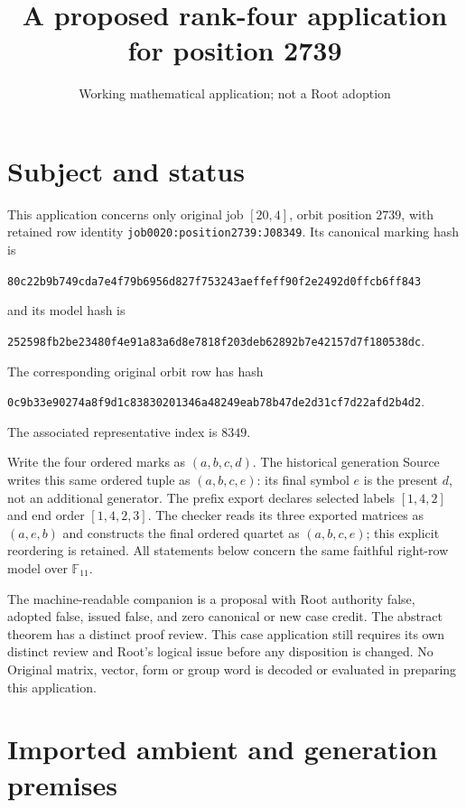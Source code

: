 \documentclass[11pt]{article}
\title{A proposed rank-four application for position 2739}
\author{Working mathematical application; not a Root adoption}
\date{}
\begin{document}
\maketitle

\section*{Subject and status}

This application concerns only original job $[20,4]$, orbit position $2739$,
with retained row identity \texttt{job0020:position2739:J08349}.
Its canonical marking hash is
\begin{center}\small\texttt{80c22b9b749cda7e4f79b6956d827f753243aeffeff90f2e2492d0ffcb6ff843}\end{center}
and its model hash is
\begin{center}\small\texttt{252598fb2be23480f4e91a83a6d8e7818f203deb62892b7e42157d7f180538dc}.\end{center}
The corresponding original orbit row has hash
\begin{center}\small\texttt{0c9b33e90274a8f9d1c83830201346a48249eab78b47de2d31cf7d22afd2b4d2}.\end{center}
The associated representative index is $8349$.

Write the four ordered marks as $(a,b,c,d)$.  The historical generation
Source writes this same ordered tuple as $(a,b,c,e)$: its final symbol $e$
is the present $d$, not an additional generator.  The prefix export
declares selected labels $[1,4,2]$ and end order $[1,4,2,3]$.  The checker
reads its three exported matrices as $(a,e,b)$ and constructs the final
ordered quartet as $(a,b,c,e)$; this explicit reordering is retained.
All statements below concern the same
faithful right-row model over $\mathbb F_{11}$.

The machine-readable companion is a proposal with Root authority false,
adopted false, issued false, and zero canonical or new case credit.  The
abstract theorem has a distinct proof review.  This case application
still requires its own distinct review and Root's logical issue before
any disposition is changed.  No Original matrix, vector, form or group
word is decoded or evaluated in preparing this application.

\section*{Imported ambient and generation premises}
\end{document}
